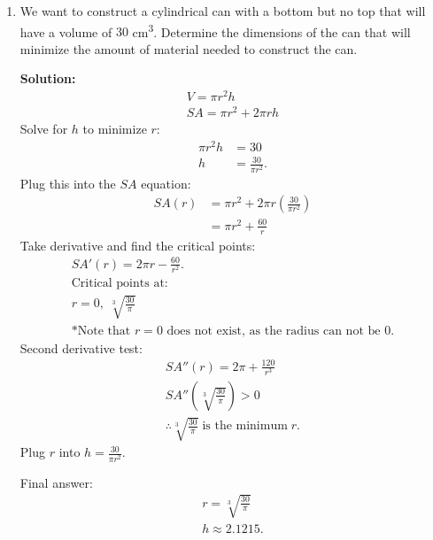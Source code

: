 \documentclass[12pt]{article}
\begin{document}
\begin{enumerate}
          \begin{center}
              * * * * *
          \end{center}

    \item We want to construct a cylindrical can with a bottom but no top that will have a volume of $30$ cm\textsuperscript{3}. Determine the dimensions of the can that will minimize the amount of material needed to construct the can.

          \noindent \textbf{Solution:}
          \begin{gather*}
              V = \pi r^2 h \\
              SA = \pi r^2 + 2\pi rh
          \end{gather*}
          Solve for $h$ to minimize $r$:
          \begin{align*}
              \pi r^2 h & = 30                  \\
              h         & = \frac{30}{\pi r^2}.
          \end{align*}
          Plug this into the $SA$ equation:
          \begin{align*}
              SA(r) & = \pi r^2 + 2\pi r \left( \frac{30}{\pi r^2} \right) \\[6pt]
                    & = \pi r^2 + \frac{60}{r}
          \end{align*}
          Take derivative and find the critical points:
          \begin{gather*}
              SA'(r) = 2 \pi r - \frac{60}{r^2}. \\[6pt]
              \text{Critical points at:} \\
              r = 0, \; \sqrt[3]{\frac{30}{\pi}} \\[6pt]
              \text{*Note that $r=0$ does not exist, as the radius can not be $0$.}
          \end{gather*}
          Second derivative test:
          \begin{gather*}
              SA''(r) = 2 \pi + \frac{120}{r^3} \\[6pt]
              SA'' \left( \sqrt[3]{\frac{30}{\pi}} \right) > 0 \\[6pt]
              \therefore \sqrt[3]{\frac{30}{\pi}} \; \text{is the minimum} \; r.
          \end{gather*}
          Plug $r$ into $h=\frac{30}{\pi r^2}$.

          \noindent Final answer:
          \begin{gather*}
              r = \sqrt[3]{\frac{30}{\pi}} \\[6pt]
              h \approx 2.1215.
          \end{gather*}
\end{enumerate}
\end{document}
